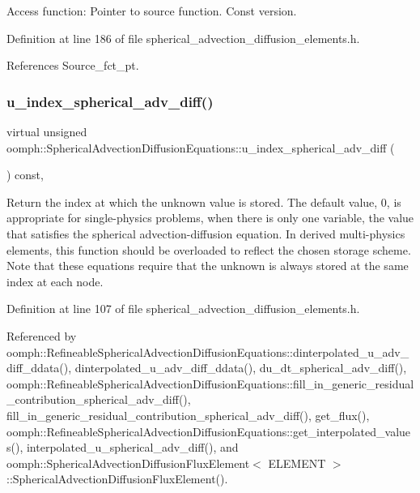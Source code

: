 Access function\+: Pointer to source function. Const version. 



Definition at line 186 of file spherical\+\_\+advection\+\_\+diffusion\+\_\+elements.\+h.



References Source\+\_\+fct\+\_\+pt.

\mbox{\label{classoomph_1_1SphericalAdvectionDiffusionEquations_a9a2928db14dc07aa3af1ee2dd7901dc5}} 
\subsubsection{\texorpdfstring{u\+\_\+index\+\_\+spherical\+\_\+adv\+\_\+diff()}{u\_index\_spherical\_adv\_diff()}}
{\footnotesize\ttfamily virtual unsigned oomph\+::\+Spherical\+Advection\+Diffusion\+Equations\+::u\+\_\+index\+\_\+spherical\+\_\+adv\+\_\+diff (\begin{DoxyParamCaption}{ }\end{DoxyParamCaption}) const\hspace{0.3cm}{\ttfamily [inline]}, {\ttfamily [virtual]}}



Return the index at which the unknown value is stored. The default value, 0, is appropriate for single-\/physics problems, when there is only one variable, the value that satisfies the spherical advection-\/diffusion equation. In derived multi-\/physics elements, this function should be overloaded to reflect the chosen storage scheme. Note that these equations require that the unknown is always stored at the same index at each node. 



Definition at line 107 of file spherical\+\_\+advection\+\_\+diffusion\+\_\+elements.\+h.



Referenced by oomph\+::\+Refineable\+Spherical\+Advection\+Diffusion\+Equations\+::dinterpolated\+\_\+u\+\_\+adv\+\_\+diff\+\_\+ddata(), dinterpolated\+\_\+u\+\_\+adv\+\_\+diff\+\_\+ddata(), du\+\_\+dt\+\_\+spherical\+\_\+adv\+\_\+diff(), oomph\+::\+Refineable\+Spherical\+Advection\+Diffusion\+Equations\+::fill\+\_\+in\+\_\+generic\+\_\+residual\+\_\+contribution\+\_\+spherical\+\_\+adv\+\_\+diff(), fill\+\_\+in\+\_\+generic\+\_\+residual\+\_\+contribution\+\_\+spherical\+\_\+adv\+\_\+diff(), get\+\_\+flux(), oomph\+::\+Refineable\+Spherical\+Advection\+Diffusion\+Equations\+::get\+\_\+interpolated\+\_\+values(), interpolated\+\_\+u\+\_\+spherical\+\_\+adv\+\_\+diff(), and oomph\+::\+Spherical\+Advection\+Diffusion\+Flux\+Element$<$ E\+L\+E\+M\+E\+N\+T $>$\+::\+Spherical\+Advection\+Diffusion\+Flux\+Element().

